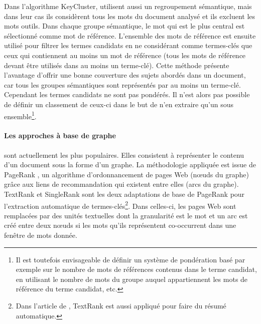           Dans l'algorithme KeyCluster,  \citet{liu2009keycluster} utilisent aussi
          un regroupement sémantique, mais dans leur cas ils considèrent tous les
          mots du document analysé et ils excluent les mots outils. Dans chaque
          groupe sémantique, le mot qui est le plus central est sélectionné comme
          mot de référence. L'ensemble des mots de référence est ensuite utilisé
          pour filtrer les termes candidats en ne considérant comme termes-clés que
          ceux qui contiennent au moins un mot de référence (tous les mots de
          référence devant être utilisés dans au moins un terme-clé). Cette méthode
          présente l'avantage d'offrir une bonne couverture des sujets abordés dans
          un document, car tous les groupes sémantiques sont représentés par au
          moins un terme-clé. Cependant les termes candidats ne sont pas pondérés.
          Il n'est alors pas possible de définir un classement de ceux-ci dans le
          but de n'en extraire qu'un sous ensemble\footnote{Il est toutefois
          envisageable de définir un système de pondération basé par exemple sur le
          nombre de mots de références contenus dans le terme candidat, en utilisant le
          nombre de mots du groupe auquel appartiennent les mots de référence du
          terme candidat, etc.}.

        \paragraph{Les approches à base de graphe}
          sont actuellement les plus populaires. Elles consistent à représenter le
          contenu d'un document sous la forme d'un graphe. La méthodologie appliquée
          est issue de PageRank \citep{brin1998pagerank}, un algorithme
          d'ordonnancement de pages Web (n\oe{}uds du graphe) grâce aux liens de
          recommandation qui existent entre elles (arcs du graphe). TextRank
          \citep{mihalcea2004textrank} et SingleRank \citep{wan2008expandrank} sont
          les deux adaptations de base de PageRank pour l'extraction automatique de
          termes-clés\footnote{Dans l'article de \citet{mihalcea2004textrank},
          TextRank est aussi appliqué pour faire du résumé automatique.}. Dans
          celles-ci, les pages Web sont remplacées par des unités textuelles dont la
          granularité est le mot et un arc est créé entre deux n\oe{}uds si les mots
          qu'ils représentent co-occurrent dans une fenêtre de mots donnée.
        
